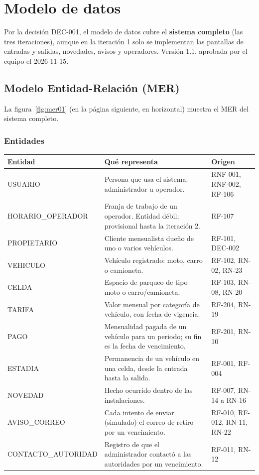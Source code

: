 \chapter{Modelo de datos}\label{cap:datos}

Por la decisión DEC-001, el modelo de datos cubre el \textbf{sistema completo} (las tres iteraciones), aunque en la iteración 1 solo se implementan las pantallas de entradas y salidas, novedades, avisos y operadores. Versión 1.1, aprobada por el equipo el 2026-11-15.

\section{Modelo Entidad-Relación (MER)}
La figura~\ref{fig:mer01} (en la página siguiente, en horizontal) muestra el MER del sistema completo.

\subsection{Entidades}
\begin{longtable}{>{\raggedright\arraybackslash}p{4.6cm}>{\raggedright\arraybackslash}p{6.6cm}>{\raggedright\arraybackslash}p{3.2cm}}
\toprule
\textbf{Entidad} & \textbf{Qué representa} & \textbf{Origen}\\
\midrule\endhead
USUARIO & Persona que usa el sistema: administrador u operador. & RNF-001, RNF-002, RF-106\\
HORARIO\_OPERADOR & Franja de trabajo de un operador. Entidad débil; provisional hasta la iteración 2. & RF-107\\
PROPIETARIO & Cliente mensualista dueño de uno o varios vehículos. & RF-101, DEC-002\\
VEHICULO & Vehículo registrado: moto, carro o camioneta. & RF-102, RN-02, RN-23\\
CELDA & Espacio de parqueo de tipo moto o carro/camioneta. & RF-103, RN-08, RN-20\\
TARIFA & Valor mensual por categoría de vehículo, con fecha de vigencia. & RF-204, RN-19\\
PAGO & Mensualidad pagada de un vehículo para un periodo; su fin es la fecha de vencimiento. & RF-201, RN-10\\
ESTADIA & Permanencia de un vehículo en una celda, desde la entrada hasta la salida. & RF-001, RF-004\\
NOVEDAD & Hecho ocurrido dentro de las instalaciones. & RF-007, RN-14 a RN-16\\
AVISO\_CORREO & Cada intento de enviar (simulado) el correo de retiro por un vencimiento. & RF-010, RF-012, RN-11, RN-22\\
CONTACTO\_AUTORIDAD & Registro de que el administrador contactó a las autoridades por un vencimiento. & RF-011, RN-12\\
\bottomrule
\end{longtable}

